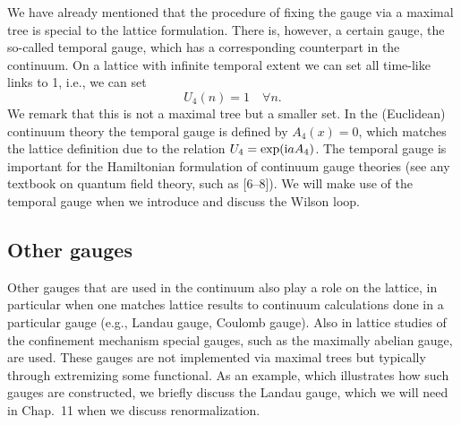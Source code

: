 We have already mentioned that the procedure of fixing the gauge via a maximal
tree is special to the lattice formulation. There is, however, a certain gauge,
the so-called temporal gauge, which has a corresponding counterpart in the
continuum. On a lattice with infinite temporal extent we can set all time-like
links to 1, i.e., we can set
\begin{equation}
  U_4(n) = 1 \quad \forall n .
\end{equation}
We remark that this is not a maximal tree but a smaller set. In the (Euclidean)
continuum theory the temporal gauge is defined by $A_4(x) = 0$, which matches
the lattice definition due to the relation $U_4 = \exp(\mathrm{i} a A_4)$. The temporal
gauge is important for the Hamiltonian formulation of continuum gauge theories
(see any textbook on quantum field theory, such as [6--8]). We will make use of
the temporal gauge when we introduce and discuss the Wilson loop.

\subsection{Other gauges}

Other gauges that are used in the continuum also play a role on the lattice, in
particular when one matches lattice results to continuum calculations done in a
particular gauge (e.g., Landau gauge, Coulomb gauge). Also in lattice studies
of the confinement mechanism special gauges, such as the maximally abelian
gauge, are used. These gauges are not implemented via maximal trees but
typically through extremizing some functional. As an example, which illustrates
how such gauges are constructed, we briefly discuss the Landau gauge, which we
will need in Chap.~11 when we discuss renormalization.

